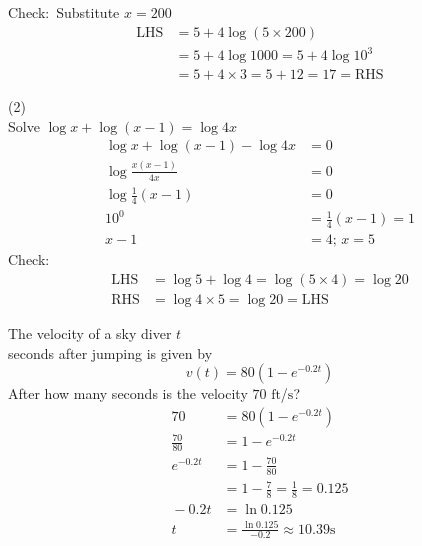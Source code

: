 Check:\ Substitute $x =200$
\begin{align*}\text{LHS} &  = 5 +4 \log  \left (5 \times 200\right ) \\
&  = 5 +4 \log  1000 =5 +4 \log  10^{3} \\
&  = 5 +4 \times 3 =5 +12 =17 =\text{RHS}\end{align*}

\begin{tasks}[label-width={6em}](2)
	\task[Example 3]\\
Solve $\log  x +\log  \left (x -1\right ) =\log  4 x$\\ \solution
\begin{align*}\log  x +\log  \left (x -1\right ) -\log  4 x &  = 0 \\
\log  \frac{x \left (x -1\right )}{4 x} &  = 0 \\
\log  \frac{1}{4} \left (x -1\right ) &  = 0 \\
\text{}10^{0} &  = \frac{1}{4} \left (x -1\right ) =1 \\
x -1 &  = 4;\, x=5\end{align*}
Check:
\begin{align*}\text{LHS} &  = \log  5 +\log  4 =\log  \left (5 \times 4\right ) =\log  20 \\
\text{RHS} &  = \log  4 \times 5 =\log  20 =\text{LHS}\end{align*}

\task[Example 4] The velocity of a sky diver $t$ \\seconds after jumping is given by
\begin{equation*}v \left (t\right ) =80 \left (1 -e^{ -0.2 t}\right )
\end{equation*}
After how many seconds is the velocity $70$ $\mbox{ft}$/$\mbox{s}$?\solution
\begin{align*}70 &  = 80 \left (1 -e^{ -0.2 t}\right ) \\
\frac{70}{80} &  = 1 -e^{ -0.2 t} \\
e^{ -0.2 t} &  = 1 -\frac{70}{80} \\
&  = 1 -\frac{7}{8} =\frac{1}{8} =0.125 \\
\text{} -0.2 t &  = \ln  0.125 \\
t &  = \frac{\ln  0.125}{ -0.2} \approx 10.39\text{}\mbox{s}\end{align*}
\end{tasks}

